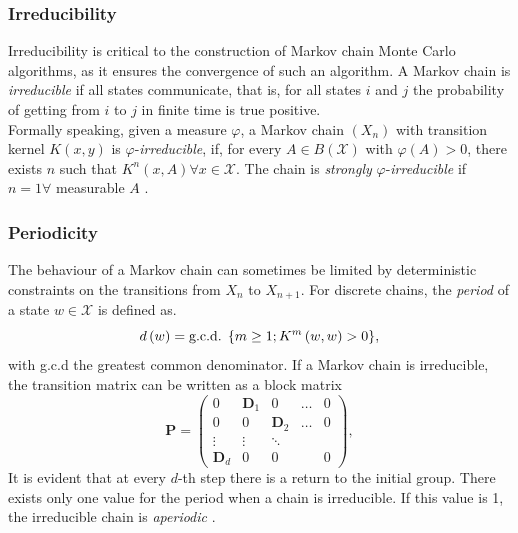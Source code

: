 \subsubsection{Irreducibility} \label{sssec:irreducibility}
Irreducibility is critical to the construction of Markov chain Monte Carlo algorithms, as it ensures the convergence of such an algorithm. A Markov chain is \textit{irreducible} if all states communicate, that is, for all states $i$ and $j$ the probability of getting from $i$ to $j$ in finite time is true positive. \\
Formally speaking, given a measure $\varphi$, a Markov chain $\left(X_n\right)$ with transition kernel $K\left(x,y\right)$ is $\varphi$-\textit{irreducible}, if, for every $A\in B\left(\mathcal{X}\right)$ with $\varphi\left(A\right)>0$, there exists $n$ such that $K^n\left(x,A\right) \forall x\in\mathcal{X}$. The chain is \textit{strongly} $\varphi$-\textit{irreducible} if $n=1\forall$ measurable $A$ \autocite[][213--214]{robert2013monte}.
\subsubsection{Periodicity} 
The behaviour of a Markov chain can sometimes be limited by deterministic constraints on the transitions from $X_n$ to $X_{n+1}$. For discrete chains, the \textit{period} of a state $w\in\mathcal{X}$ is defined as. 
\begin{equation*}
    d\left(w\right)=\hbox{g.c.d. } \lbrace m\geq 1;K^m\left(w,w\right)>0\rbrace,
\end{equation*}
with g.c.d the greatest common denominator. If a Markov chain is irreducible, the transition matrix can be written as a block matrix
\begin{equation}
    \pmb{P}=\begin{pmatrix}
    0 & \pmb{D}_1 & 0 & \dots & 0\\
    0 & 0 & \pmb{D}_2 & \dots & 0 \\
    \vdots & \vdots & \ddots  \\
    \pmb{D}_d & 0 & 0 & & 0
    \end{pmatrix},
\end{equation}
It is evident that at every $d$-th step there is a return to the initial group. There exists only one value for the period when a chain is irreducible. If this value is 1, the irreducible chain is \textit{aperiodic} \autocite[][217--218]{robert2013monte}.
